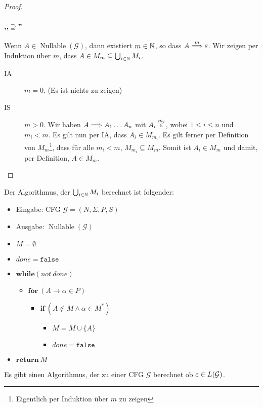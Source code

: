 \begin{proof}
  
  \paragraph{,,$\supseteq$''}
  Wenn $A \in \operatorname{Nullable}(\mathcal{G})$, dann existiert $m \in \mathbb{N}$, so dass $A \stackrel{m}{\==>} \Eps$.
  Wir zeigen per Induktion über $m$, dass $A \in M_m \subseteq \bigcup_{i \in \mathbb{N}} M_i$.
  \begin{description}
  \item[IA] $m = 0$.
    (Es ist nichts zu zeigen)
  \item[IS] $m > 0$.
    Wir haben $A \==> A_1\ldots A_n$ mit $A_i \stackrel{m_i} {\varepsilon}$, wobei $1 \le i \le n$ und $m_i < m$.
    Es gilt nun per IA, dass $A_i \in M_{m_i}$.
    Es gilt ferner per Definition von $M_m$\footnote{Eigentlich per Induktion über $m$ zu zeigen}, dass für alle $m_i < m$, $M_{m_i} \subseteq M_m$.
    Somit ist $A_i \in M_m$ und damit, per Definition, $A \in M_m$.
  \end{description}
\end{proof}
Der Algorithmus, der $\bigcup_{i \in \mathbb{N}} M_i$ berechnet ist folgender:
\begin{itemize}
\item Eingabe: CFG $\mathcal{G} = (N, \Sigma, P, S)$
\item Ausgabe: $\operatorname{Nullable}(\mathcal{G})$
\item[] $M = \emptyset$
\item[] $\mathit{done} = \mathtt{false}$
\item[] $\mathbf{while} (\mathit{not}~\mathit{done})$
  \begin{itemize}
  \item[] $\mathbf{for}~(A \to \alpha \in P)$
    \begin{itemize}
    \item[] $\mathbf{if}~(A \not \in M \land \alpha \in M^*)$
      \begin{itemize}
      \item[] $M = M \cup \{A \}$
      \item[] $\mathit{done} = \mathtt{false}$
      \end{itemize}
    \end{itemize}
  \end{itemize}
\item[] $\mathbf{return}~M$
\end{itemize}
\begin{Korollar}
  Es gibt einen Algorithmus, der zu einer CFG $\mathcal{G}$ berechnet ob $\varepsilon \in L(\mathcal{G})$.
\end{Korollar}
